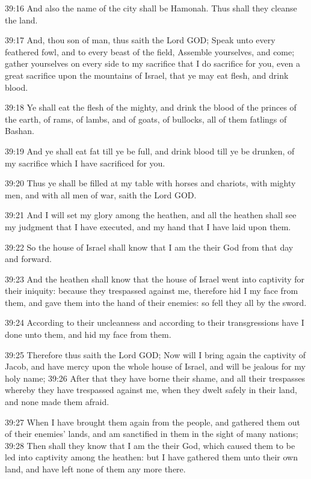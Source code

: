 39:16 And also the name of the city shall be Hamonah. Thus shall they cleanse the land.

39:17 And, thou son of man, thus saith the Lord GOD; Speak unto every feathered fowl, and to every beast of the field, Assemble yourselves, and come; gather yourselves on every side to my sacrifice that I do sacrifice for you, even a great sacrifice upon the mountains of Israel, that ye may eat flesh, and drink blood.

39:18 Ye shall eat the flesh of the mighty, and drink the blood of the princes of the earth, of rams, of lambs, and of goats, of bullocks, all of them fatlings of Bashan.

39:19 And ye shall eat fat till ye be full, and drink blood till ye be drunken, of my sacrifice which I have sacrificed for you.

39:20 Thus ye shall be filled at my table with horses and chariots, with mighty men, and with all men of war, saith the Lord GOD.

39:21 And I will set my glory among the heathen, and all the heathen shall see my judgment that I have executed, and my hand that I have laid upon them.

39:22 So the house of Israel shall know that I am the \LORD their God from that day and forward.

39:23 And the heathen shall know that the house of Israel went into captivity for their iniquity: because they trespassed against me, therefore hid I my face from them, and gave them into the hand of their enemies: so fell they all by the sword.

39:24 According to their uncleanness and according to their transgressions have I done unto them, and hid my face from them.

39:25 Therefore thus saith the Lord GOD; Now will I bring again the captivity of Jacob, and have mercy upon the whole house of Israel, and will be jealous for my holy name; 39:26 After that they have borne their shame, and all their trespasses whereby they have trespassed against me, when they dwelt safely in their land, and none made them afraid.

39:27 When I have brought them again from the people, and gathered them out of their enemies' lands, and am sanctified in them in the sight of many nations; 39:28 Then shall they know that I am the \LORD their God, which caused them to be led into captivity among the heathen: but I have gathered them unto their own land, and have left none of them any more there.

